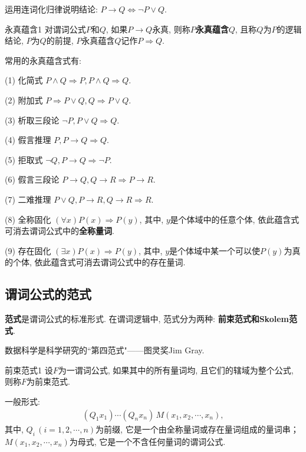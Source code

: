 \begin{newexam}
    运用连词化归律说明结论: $P\rightarrow Q \Leftrightarrow \neg P\vee Q$.
\end{newexam}
\begin{mydef}{永真蕴含}{1}
对谓词公式$P$和$Q$, 如果$P\rightarrow Q$永真, 则称\textbf{$P$永真蕴含$Q$}, 且称$Q$为$P$的逻辑结论, $P$为$Q$的前提, $P$永真蕴含$Q$记作\textcolor[rgb]{0,0,1}{$P \Rightarrow Q$}.
\end{mydef}

常用的永真蕴含式有:

      (1) 化简式     $P\wedge Q \Rightarrow  P,   P\wedge Q \Rightarrow Q$.

      (2) 附加式     $P \Rightarrow P\vee Q,   Q \Rightarrow  P\vee Q$.

      (3) \textcolor[rgb]{0,0,1}{析取三段论}    $\neg P, P\vee Q \Rightarrow  Q$.

      (4) \textcolor[rgb]{0,0,1}{假言推理}       $ P, P\rightarrow Q \Rightarrow  Q$.

      (5) \textcolor[rgb]{0,0,1}{拒取式}           $ \neg Q,  P\rightarrow Q \Rightarrow \neg  P$.

      (6) \textcolor[rgb]{0,0,1}{假言三段论}     $P\rightarrow Q,  Q\rightarrow R \Rightarrow P\rightarrow R$.

      (7) \textcolor[rgb]{0,0,1}{二难推理}       $ P\vee Q,  P\rightarrow R, Q\rightarrow R \Rightarrow  R$.

      (8) 全称固化        $(\forall x)P(x) \Rightarrow P(y)$, 其中, $y$是个体域中的任意个体, 依此蕴含式可消去谓词公式中的\textbf{全称量词}.

      (9) 存在固化 $(\exists x)P(x) \Rightarrow P(y)$, 其中, $y$是个体域中某一个可以使$P(y)$为真的个体, 依此蕴含式可消去谓词公式中的存在量词.
\subsection{谓词公式的范式}
\textbf{范式}是谓词公式的标准形式. 在谓词逻辑中, 范式分为两种: \textbf{前束范式和Skolem范式}.
\begin{remark}
  数据科学是科学研究的``第四范式"——图灵奖Jim Gray.
\end{remark}
\begin{mydef}{前束范式}{1}
设$F$为一谓词公式, 如果其中的所有量词均, 且它们的辖域为整个公式, 则称$F$为前束范式.

一般形式:
\begin{align}
  (Q_1 x_1)\cdots (Q_n x_n)\,M(x_1, x_2,\cdots, x_n),
\end{align}
其中, $Q_i\,(i=1,2,\cdots,n)$为前缀, 它是一个由全称量词或存在量词组成的量词串； $M(x_1,x_2,\cdots,x_n)$为母式, 它是一个不含任何量词的谓词公式.
\end{mydef}

